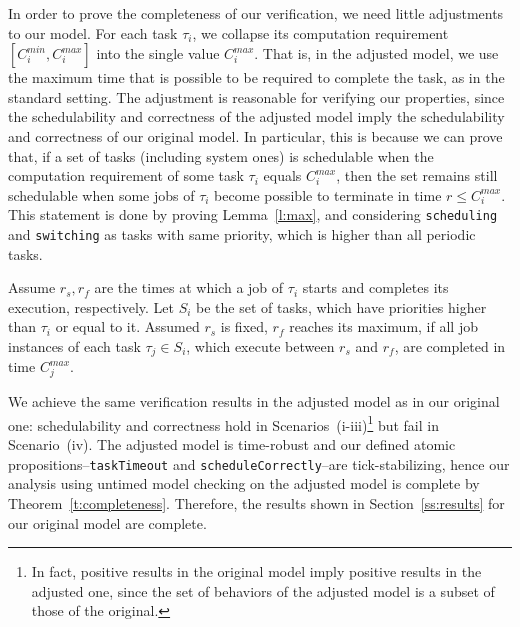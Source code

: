 \documentclass{llncs}
\begin{document}
In order to prove the completeness of our verification, we need little
adjustments to our model.  For each task $\tau_i$, we collapse its
computation requirement $[C_i^{min},C_i^{max}]$ into the single value
$C_i^{max}$.  That is, in the adjusted model, we use the maximum time
that is possible to be required to complete the task, as in the
standard setting. The adjustment is reasonable for verifying our
properties, since the schedulability and correctness of the adjusted
model imply the schedulability and correctness of our original
model. In particular, this is because we can prove that, if a set of
tasks (including system ones) is schedulable when the computation
requirement of some task $\tau_i$ equals $C_i^{max}$, then the set
remains still schedulable when some jobs of $\tau_i$ become possible
to terminate in time $r\le C_i^{max}$. This statement is done by
proving Lemma~\ref{l:max}, and considering \verb|scheduling| and
\verb|switching| as tasks with same priority, which is higher than all
periodic tasks.
\begin{lemma}
\label{l:max}
Assume $r_s, r_f$ are the times at which a job of $\tau_i$ starts and
completes its execution, respectively. Let $S_i$ be the set of tasks,
which have priorities higher than $\tau_i$ or equal to it. Assumed
$r_s$ is fixed, $r_f$ reaches its maximum, if all job instances of
each task $\tau_j\in S_i$, which execute between $r_s$ and $r_f$, are
completed in time $C_j^{max}$.
\end{lemma}

We achieve the same verification results in the adjusted model as in
our original one: schedulability and correctness hold in
Scenarios~(i-iii)\footnote{In fact, positive results in the original
  model imply positive results in the adjusted one, since the set of
  behaviors of the adjusted model is a subset of those of the
  original.} but fail in Scenario~(iv).  The adjusted model is
time-robust and our defined atomic propositions--\verb|taskTimeout|
and \verb|scheduleCorrectly|--are tick-stabilizing, hence our analysis
using untimed model checking on the adjusted model is complete by
Theorem~\ref{t:completeness}. Therefore, the results shown in
Section~\ref{ss:results} for our original model are complete.
\end{document}
